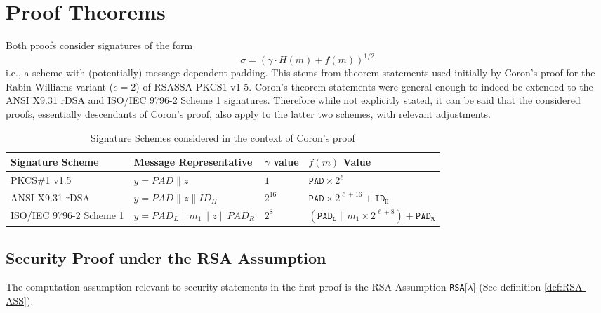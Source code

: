 \documentclass[]{final_report}
\theoremstyle{definition}
\begin{document}
\section{Proof Theorems}
Both proofs consider signatures of the form \[ \sigma = (\gamma \cdot H(m) + f(m))^{1/2} \] i.e., a scheme with (potentially) message-dependent padding. This stems from theorem statements used initially by Coron's proof \cite{coron2002security} for the Rabin-Williams variant (\( e = 2 \)) of RSASSA-PKCS1-v1 5. Coron's theorem statements were general enough to indeed be extended to the ANSI X9.31 rDSA and ISO/IEC 9796-2 Scheme 1 signatures. Therefore while not explicitly stated, it can be said that the considered proofs, essentially descendants of Coron's proof, also apply to the latter two schemes, with relevant adjustments.
\begin{table}[H]

\begin{tabular}{|m{4.38cm}|m{5cm}|m{1.5cm}|m{4cm}|}
\hline
\textbf{Signature Scheme} & \textbf{Message Representative} & \textbf{$\gamma$ value} & \textbf{\( f(m) \) Value} \\ \hline
PKCS\#1 v1.5              & \( y = PAD  \| z \)      & \(1\) & \( \texttt{PAD} \times 2^{\ell} \) \\ \hline
ANSI X9.31 rDSA           & \( y = PAD  \| z \| ID_{H} \)          & \( 2^{16} \)     & \( \texttt{PAD} \times 2^{\ell + 16} + \texttt{ID}_{\texttt{H}} \)     \\ \hline
ISO/IEC 9796-2 Scheme 1   & \( y = PAD_{L} \| m_{1} \| z \| PAD_{R} \)            & \( 2^{8} \)       & \( (\texttt{PAD}_{\texttt{L}} \| m_{1} \times 2^{\ell + 8}) + \texttt{PAD}_{\texttt{R}} \)       \\ \hline
\end{tabular}
\caption{Signature Schemes considered in the context of Coron's proof \cite{coron2002security}}
\label{table:coron}
\end{table}




\subsection{Security Proof under the RSA Assumption}
The computation assumption relevant to security statements in the first proof is the RSA Assumption \texttt{RSA}[$\lambda$] (See definition \ref{def:RSA-ASS}).
\end{document}
